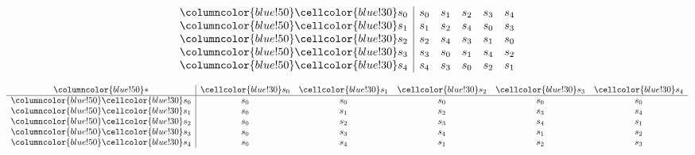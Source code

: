 \documentclass{article}
\begin{document}
\begin{center}
\begin{minipage}{0.23\textwidth}
\[\begin{array}{>{\columncolor{blue!50}}c|ccccc}
    \cellcolor{blue!30}s_0 & s_0 & s_1 & s_2 & s_3 & s_4 \\
    \cellcolor{blue!30}s_1 & s_1 & s_2 & s_4 & s_0 & s_3 \\
    \cellcolor{blue!30}s_2 & s_2 & s_4 & s_3 & s_1 & s_0 \\
    \cellcolor{blue!30}s_3 & s_3 & s_0 & s_1 & s_4 & s_2 \\
    \cellcolor{blue!30}s_4 & s_4 & s_3 & s_0 & s_2 & s_1 \\
    \end{array}
    \]
\end{minipage}%
\hfill
\begin{minipage}{0.23\textwidth}
    \centering
    \small{}
    \renewcommand{\arraystretch}{1} 
    \[
    \begin{array}{>{\columncolor{blue!50}}c|ccccc}
    * & \cellcolor{blue!30}s_0 & \cellcolor{blue!30}s_1 & \cellcolor{blue!30}s_2 & \cellcolor{blue!30}s_3 & \cellcolor{blue!30}s_4 \\ \hline
    \cellcolor{blue!30}s_0 & s_0 & s_0 & s_0 & s_0 & s_0 \\
    \cellcolor{blue!30}s_1 & s_0 & s_1 & s_2 & s_3 & s_4 \\
    \cellcolor{blue!30}s_2 & s_0 & s_2 & s_3 & s_4 & s_1 \\
    \cellcolor{blue!30}s_3 & s_0 & s_3 & s_4 & s_1 & s_2 \\
    \cellcolor{blue!30}s_4 & s_0 & s_4 & s_1 & s_2 & s_3 \\
    \end{array}
    \]
\end{minipage}%


\end{center}
\end{document}
